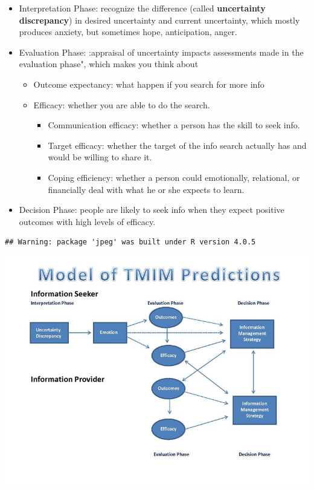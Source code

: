 \documentclass[
]{book}
\providecommand{\tightlist}{%
  \setlength{\itemsep}{0pt}\setlength{\parskip}{0pt}}
\begin{document}
\begin{itemize}
\item
  Interpretation Phase: recognize the difference (called \textbf{uncertainty discrepancy}) in desired uncertainty and
  current uncertainty, which mostly produces anxiety, but sometimes hope, anticipation, anger.\\
\item
  Evaluation Phase: :appraisal of uncertainty impacts assessments made in the evaluation phase", which makes you think
  about

  \begin{itemize}
  \item
    Outcome expectancy: what happen if you search for more info\\
  \item
    Efficacy: whether you are able to do the search.

    \begin{itemize}
    \tightlist
    \item
      Communication efficacy: whether a person has the skill to seek info.\\
    \item
      Target efficacy: whether the target of the info search actually has and would be willing to share it.\\
    \item
      Coping efficiency: whether a person could emotionally, relational, or financially deal with what he or she
      expects to learn.
    \end{itemize}
  \end{itemize}
\item
  Decision Phase: people are likely to seek info when they expect positive outcomes with high levels of efficacy.
\end{itemize}

\begin{verbatim}
## Warning: package 'jpeg' was built under R version 4.0.5
\end{verbatim}

\begin{center}\includegraphics[width=11.11in]{images/Model of TMIM Predicitons} \end{center}
\end{document}
